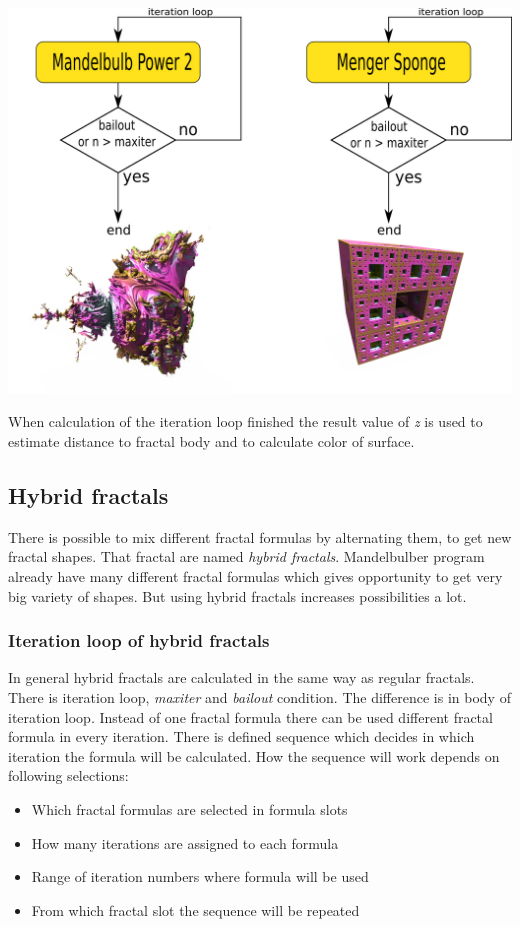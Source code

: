 \includegraphics[width=\linewidth]{img/manual/media/iteration_loops.png}

When calculation of the iteration loop finished the result value of \emph{z} is
used to estimate distance to fractal body and to calculate color of surface.

\subsection{Hybrid fractals}

There is possible to mix different fractal formulas by alternating them, to get
new fractal shapes. That fractal are named \emph{hybrid fractals}. Mandelbulber
program already have many different fractal formulas which gives opportunity to
get very big variety of shapes. But using hybrid fractals increases
possibilities a lot.

\subsubsection{Iteration loop of hybrid fractals}

In general hybrid fractals are calculated in the same way as regular fractals.
There is iteration loop, \emph{maxiter} and \emph{bailout} condition. The
difference is in body of iteration loop. Instead of one fractal formula there
can be used different fractal formula in every iteration. There is defined
sequence which decides in which iteration the formula will be calculated. How
the sequence will work depends on following selections: \begin{itemize} \item
	Which fractal formulas are selected in formula slots \item How many iterations
	are assigned to each formula \item Range of iteration numbers where formula will
	be used \item From which fractal slot the sequence will be repeated
\end{itemize}

